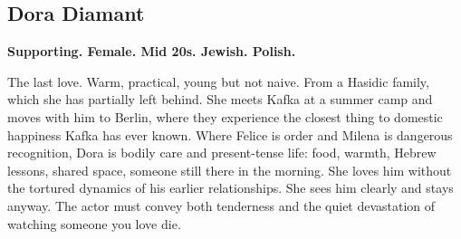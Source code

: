 \subsection{Dora Diamant}
\textbf{Supporting. Female. Mid 20s. Jewish. Polish.}

The last love. Warm, practical, young but not naive. From a Hasidic family, which she has partially left behind. She meets Kafka at a summer camp and moves with him to Berlin, where they experience the closest thing to domestic happiness Kafka has ever known. Where Felice is order and Milena is dangerous recognition, Dora is bodily care and present-tense life: food, warmth, Hebrew lessons, shared space, someone still there in the morning. She loves him without the tortured dynamics of his earlier relationships. She sees him clearly and stays anyway. The actor must convey both tenderness and the quiet devastation of watching someone you love die.
